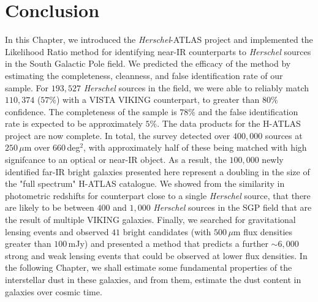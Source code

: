 \section{Conclusion}

In this Chapter, we introduced the \textit{Herschel}-ATLAS project and implemented the Likelihood Ratio method for identifying near-IR counterparts to \textit{Herschel} sources in the South Galactic Pole field. We predicted the efficacy of the method by estimating the completeness, cleanness, and false identification rate of our sample. For $193,527$ \textit{Herschel} sources in the field, we were able to reliably match $110,374$ ($57\%$) with a VISTA VIKING counterpart, to greater than $80\%$ confidence. The completeness of the sample is $78\%$ and the false identification rate is expected to be approximately $5\%$. The data products for the H-ATLAS project are now complete. In total, the survey detected over $400,000$ sources at $250\,\mu$m over $660\,$deg$^2$, with approximately half of these being matched with high signifcance to an optical or near-IR object. As a result, the $100,000$ newly identified far-IR bright galaxies presented here represent a doubling in the size of the "full spectrum" H-ATLAS catalogue. We showed from the similarity in photometric redshifts for counterpart close to a single \textit{Herschel} source, that there are likely to be between $400$ and $1,000$ \textit{Herschel} sources in the SGP field that are the result of multiple VIKING galaxies. Finally, we searched for gravitational lensing events and observed $41$ bright candidates (with $500\,\mu$m flux densities greater than $100\,$mJy) and presented a method that predicts a further $\sim 6,000$ strong and weak lensing events that could be observed at lower flux densities. In the following Chapter, we shall estimate some fundamental properties of the interstellar dust in these galaxies, and from them, estimate the dust content in galaxies over cosmic time.
